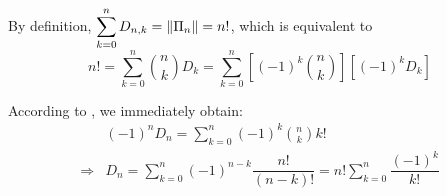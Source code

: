 By definition, $ \sum_{k=0}^nD_{n,k} =\card{\Pi_n}= n!$,
which is equivalent to
 \begin{equation}
 n! = \sum_{k=0}^n{n\choose{k}}D_k =
  \sum_{k=0}^n\left[ (-1)^k{n\choose{k}}\right]\left[(-1)^kD_k\right]
  \label{eqn:fact}
  \end{equation}

According to , we immediately obtain:
\begin{align*}
&(-1)^nD_n = \sum_{k=0}^n(-1)^k{n\choose{k}}k! \\
\Rightarrow & D_n = \sum_{k=0}^n(-1)^{n-k}\dfrac{n!}{(n-k)!} = n!\sum_{k=0}^n\dfrac{(-1)^k}{k!}
\end{align*}

